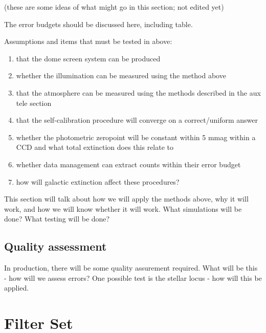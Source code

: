 \documentclass[12pt,preprint]{aastex}
\begin{document}
(these are some ideas of what might go in this section; not edited yet)

The error budgets should be discussed here, including table.

Assumptions and items that must be tested in above: 
\begin{enumerate}
\item{that the dome screen system can be produced}
\item{whether the illumination can be measured using the method above}
\item{that the atmosphere can be measured using the methods described
    in the aux tele section}
\item{that the self-calibration procedure will converge on a
    correct/uniform answer}
\item{whether the photometric zeropoint will be constant within 5 mmag 
    within a CCD and what total extinction does this relate to}
\item{whether data management can extract counts within their error
    budget}
\item{how will galactic extinction affect these procedures?}
\end{enumerate}

This section will talk about how we will apply the methods above, why
it will work, and how we will know whether it will work. What
simulations will be done? What testing
will be done? 


\subsection{Quality assessment}
In production, there will be some quality assurement required. What
will be this - how will we assess errors? 
One possible test is the stellar locus - how will this be applied.







\appendix


\section{Filter Set}
\end{document}
